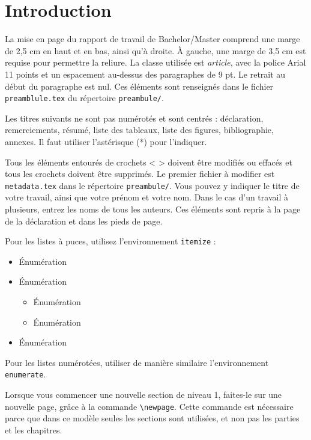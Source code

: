 

\section{Introduction}

La mise en page du rapport de travail de Bachelor/Master comprend une marge de 2,5 cm en haut et en bas, ainsi qu’à droite. À gauche, une marge de 3,5 cm est requise pour permettre la reliure. La classe utilisée est \emph{article}, avec la police Arial 11 points et un espacement au-dessus des paragraphes de 9 pt. Le retrait au début du paragraphe est nul. Ces éléments sont renseignés dans le fichier \texttt{preamblule.tex} du répertoire \texttt{preambule/}.

Les titres suivants ne sont pas numérotés et sont centrés : déclaration, remerciements, résumé, liste des tableaux, liste des figures, bibliographie, annexes. Il faut utiliser l'astérisque (*) pour l'indiquer.

Tous les éléments entourés de crochets < > doivent être modifiés ou effacés et tous les crochets doivent être supprimés. Le premier fichier à modifier est \texttt{metadata.tex} dans le répertoire \texttt{preambule/}. Vous pouvez y indiquer le titre de votre travail, ainsi que votre prénom et votre nom. Dans le cas d'un travail à plusieurs, entrez les noms de tous les auteurs. Ces éléments sont repris à la page de la déclaration et dans les pieds de page.

Pour les listes à puces, utilisez l'environnement \texttt{itemize} :

\begin{itemize}[itemsep=0pt]
	\item Énumération
	\item Énumération
	\begin{itemize}[itemsep=0pt]
		\item Énumération
		\item Énumération
	\end{itemize}
	\item Énumération
\end{itemize}

Pour les listes numérotées, utiliser de manière similaire l'environnement \texttt{enumerate}.

Lorsque vous commencer une nouvelle section de niveau 1, faites-le sur une nouvelle page, grâce à la commande \verb?\newpage?. Cette commande est nécessaire parce que dans ce modèle seules les sections sont utilisées, et non pas les parties et les chapitres.

